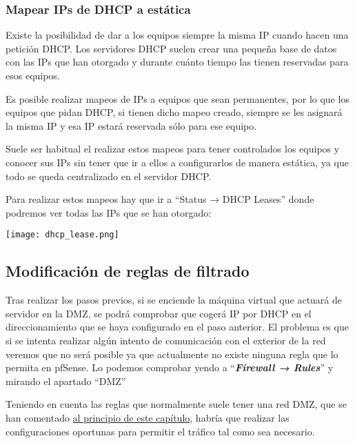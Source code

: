 \subsubsection{Mapear IPs de DHCP a estática}
Existe la posibilidad de dar a los equipos siempre la misma IP cuando hacen una petición DHCP. Los servidores DHCP suelen crear una pequeña base de datos con las IPs que han otorgado y durante cuánto tiempo las tienen reservadas para esos equipos.

Es posible realizar mapeos de IPs a equipos que sean permanentes, por lo que los equipos que pidan DHCP, si tienen dicho mapeo creado, siempre se les asignará la misma IP y esa IP estará reservada sólo para ese equipo.

Suele ser habitual el realizar estos mapeos para tener controlados los equipos y conocer sus IPs sin tener que ir a ellos a configurarlos de manera estática, ya que todo se queda centralizado en el servidor DHCP.

Para realizar estos mapeos hay que ir a “Status → DHCP Leases” donde podremos ver todas las IPs que se han otorgado:

\begin{center}
    \vspace{-10pt}
    \texttt{[image: dhcp\_lease.png]}
    \vspace{-20pt}
\end{center}


\subsection{Modificación de reglas de filtrado}
Tras realizar los pasos previos, si se enciende la máquina virtual que actuará de servidor en la DMZ, se podrá comprobar que cogerá IP por DHCP en el direccionamiento que se haya configurado en el paso anterior. El problema es que si se intenta realizar algún intento de comunicación con el exterior de la red veremos que no será posible ya que actualmente no existe ninguna regla que lo permita en pfSense. Lo podemos comprobar yendo a “\textit{\textbf{Firewall → Rules}}” y mirando el apartado “DMZ”


Teniendo en cuenta las reglas que normalmente suele tener una red DMZ, que se han comentado \href{crear_una_nueva_red}{al principio de este capítulo}, habría que realizar las configuraciones oportunas para permitir el tráfico tal como sea necesario.

